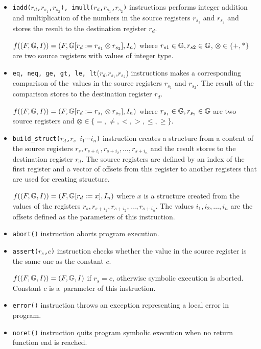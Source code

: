 \begin{itemize}
	\item {\tt iadd($r_d$,$r_{s_1}$,$r_{s_2}$), imull($r_d$,$r_{s_1}$,$r_{s_2}$)}
		instructions performs integer addition and multiplication of the numbers
		in the source registers $r_{s_1}$ and $r_{s_2}$ and stores the result to
		the destination register $r_d$.
		
		$f((F, \mathbb{G}, I)) = (F, \mathbb{G} [r_d := r_{s_1} \otimes r_{s_2}], I_n)$
		where $r_{s1} \in \mathbb{G}, r_{s2} \in \mathbb{G}$, $\otimes \in \{+,*\}$
		are two source registers with values of integer type.

	\item {\tt eq, neq, ge, gt, le, lt}($r_d$,$r_{s_1}$,$r_{s_2}$) instructions
		makes a corresponding comparison of the~values in the source registers $r_{s_1}$
		and $r_{s_2}$.
		The result of the comparison stores to the destination register $r_d$.
		
		$f((F, \mathbb{G}, I)) = (F, \mathbb{G} [r_d := r_{s_1} \otimes r_{s_2}], I_n)$
		where $r_{s_1} \in \mathbb{G}, r_{s_2} \in \mathbb{G}$ are two source registers
		and $\otimes \in \{=,\neq, <,>,\leq,\geq\}$.
	
	\item {\tt build\_struct($r_d$,$r_{s}$ $i_1 \cdots i_n$)} instruction creates a structure from a
		content of the source registers $r_s,r_{s+i_1},r_{s+i_2}, \ldots, r_{s+i_n}$
		and the result stores to the destination register $r_d$.
		The source registers are defined by an index of the first register and
		a vector of offsets from this register to another registers
		that are used for creating structure.
		
		$f((F, \mathbb{G}, I)) = (F, \mathbb{G} [r_d := x], I_n)$
		where $x$ is a structure created from the values of the registers $r_s,r_{s+i_1},r_{s+i_2}, \ldots, r_{s+i_n}$.
		The values $i_1, i_2, \ldots, i_n$ are the offsets defined as the parameters of this instruction.
	
	\item {\tt abort()} instruction aborts program execution.
	
	\item {\tt assert($r_s$,$c$)} instruction checks whether the value
		in the source register is the same one as the constant $c$.
		
		$f((F, \mathbb{G}, I)) = (F, \mathbb{G}, I)$ if $r_s = c$, otherwise
		symbolic execution is aborted.
		Constant $c$ is a~parameter of this instruction.
	
	\item {\tt error()} instruction throws an exception representing
		a local error in program.
	
	\item {\tt noret()} instruction quits program symbolic execution when
		no return function end is reached.

\end{itemize}


